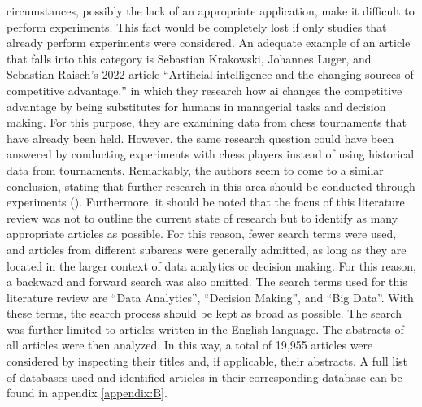 circumstances, possibly the lack of an appropriate application, make it difficult to perform experiments. This fact would be completely lost if only studies that already perform experiments were considered. An adequate example of an article that falls into this category is Sebastian Krakowski, Johannes Luger, and Sebastian Raisch's 2022 article \enquote{Artificial intelligence and the changing sources of competitive advantage,} in which they research how \ac{ai} changes the competitive advantage by being substitutes for humans in managerial tasks and decision making. For this purpose, they are examining data from chess tournaments that have already been held. However, the same research question could have been answered by conducting experiments with chess players instead of using historical data from tournaments. Remarkably, the authors seem to come to a similar conclusion, stating that further research in this area should be conducted through experiments (\cite{Krakowski.2022}). Furthermore, it should be noted that the focus of this literature review was not to outline the current state of research but to identify as many appropriate articles as possible. For this reason, fewer search terms were used, and articles from different subareas were generally admitted, as long as they are located in the larger context of data analytics or decision making. For this reason, a backward and forward search was also omitted.
The search terms used for this literature review are \enquote{Data Analytics}, \enquote{Decision Making}, and \enquote{Big Data}. With these terms, the search process should be kept as broad as possible. The search was further limited to articles written in the English language. The abstracts of all articles were then analyzed. In this way, a total of 19,955 articles were considered by inspecting their titles and, if applicable, their abstracts. A full list of databases used and identified articles in their corresponding database can be found in appendix \ref{appendix:B}.

